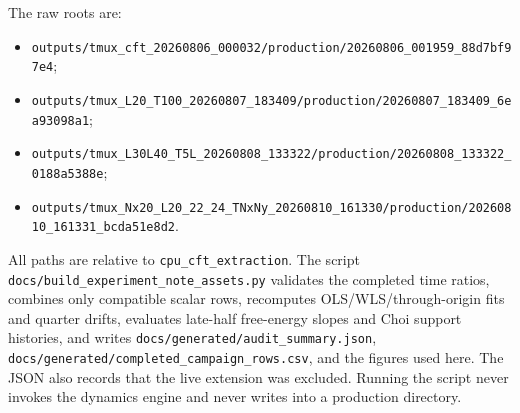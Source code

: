 \documentclass[aps,prb,onecolumn,nofootinbib,superscriptaddress]{revtex4-2}
\begin{document}
The raw roots are:
\begin{itemize}
\item \nolinkurl{outputs/tmux_cft_20260806_000032/production/20260806_001959_88d7bf97e4};
\item \nolinkurl{outputs/tmux_L20_T100_20260807_183409/production/20260807_183409_6ea93098a1};
\item \nolinkurl{outputs/tmux_L30L40_T5L_20260808_133322/production/20260808_133322_0188a5388e};
\item \nolinkurl{outputs/tmux_Nx20_L20_22_24_TNxNy_20260810_161330/production/20260810_161331_bcda51e8d2}.
\end{itemize}
All paths are relative to \texttt{cpu\_cft\_extraction}.  The script
\texttt{docs/build\_experiment\_note\_assets.py} validates the completed time ratios,
combines only compatible scalar rows, recomputes OLS/WLS/through-origin fits and quarter
drifts, evaluates late-half free-energy slopes and Choi support histories, and writes
\texttt{docs/generated/audit\_summary.json},
\texttt{docs/generated/completed\_campaign\_rows.csv}, and the figures used here.  The JSON
also records that the live extension was excluded.  Running the script never invokes the
dynamics engine and never writes into a production directory.
\end{document}
